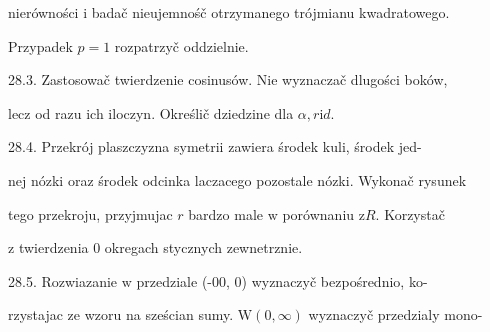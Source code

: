 \documentclass[a4paper,12pt]{article}
\begin{document}
nierówności $\mathrm{i}$ badač nieujemnośč otrzymanego trójmianu kwadratowego.

Przypadek $p=1$ rozpatrzyč oddzielnie.

28.3. Zastosowač twierdzenie cosinusów. Nie wyznaczač dlugości boków,

lecz od razu ich iloczyn. Określič dziedzine dla $\alpha, r\mathrm{i}d.$

28.4. Przekrój plaszczyzna symetrii zawiera środek kuli, środek jed-

nej nózki oraz środek odcinka laczacego pozostale nózki. Wykonač rysunek

tego przekroju, przyjmujac $r$ bardzo male $\mathrm{w}$ porównaniu $\mathrm{z}R$. Korzystač

$\mathrm{z}$ twierdzenia $0$ okregach stycznych zewnetrznie.

28.5. Rozwiazanie $\mathrm{w}$ przedziale (-00, 0) wyznaczyč bezpośrednio, ko-

rzystajac ze wzoru na sześcian sumy. $\mathrm{W}(0,\infty)$ wyznaczyč przedzialy mono-
\end{document}
